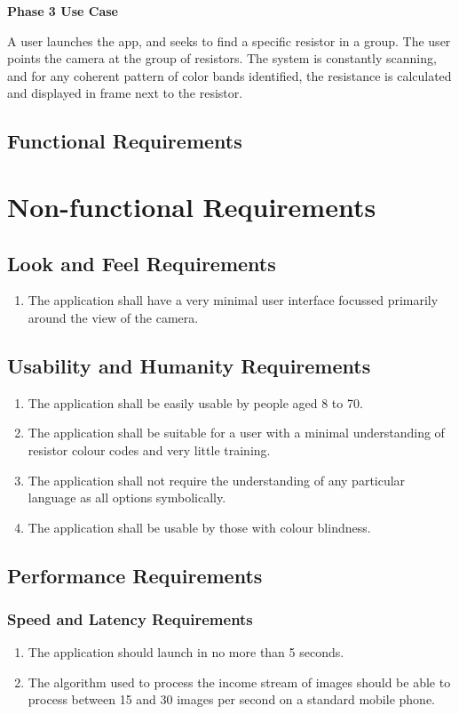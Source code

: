 \documentclass{article}
\begin{document}
\textbf{ Phase 3 Use Case}

A user launches the app, and seeks to find a specific resistor in a group.
The user points the camera at the group of resistors.
The system is constantly scanning, and for any coherent pattern of color bands identified, the resistance is calculated and displayed in frame next to the resistor.

\subsection{Functional Requirements}


\section{Non-functional Requirements}

\subsection{Look and Feel Requirements }
\begin{enumerate}
\item The application shall have a very minimal user interface focussed primarily around the view of the camera.
\end{enumerate}
\subsection{Usability and Humanity Requirements}
\begin{enumerate}
\item The application shall be easily usable by people aged 8 to 70.
\item The application shall be suitable for a user with a minimal understanding of resistor colour codes and very little training.
\item The application shall not require the understanding of any particular language as all options symbolically.
\item The application shall be usable by those with colour blindness.
\end{enumerate}
\subsection{Performance Requirements}
\subsubsection{Speed and Latency Requirements}
\begin{enumerate}
\item The application should launch in no more than 5 seconds.
\item The algorithm used to process the income stream of images should be able to process between 15 and 30 images per second on a standard mobile phone.
\end{enumerate}
\end{document}
